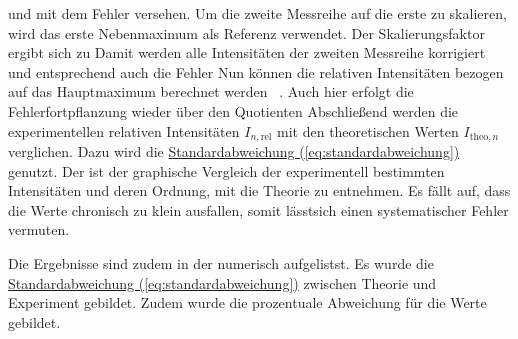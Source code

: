 und mit dem Fehler
versehen. Um die zweite Messreihe auf die erste zu skalieren, wird das erste Nebenmaximum als Referenz verwendet. Der Skalierungsfaktor ergibt sich zu
Damit werden alle Intensitäten der zweiten Messreihe korrigiert
und entsprechend auch die Fehler
Nun können die relativen Intensitäten bezogen auf das Hauptmaximum berechnet werden
 \, .
Auch hier erfolgt die Fehlerfortpflanzung wieder über den Quotienten
Abschließend werden die experimentellen relativen Intensitäten $I_{n,\text{rel}}$ mit den theoretischen Werten $I_{\text{theo},n}$ verglichen. Dazu wird die \hyperref[eq:standardabweichung]{Standardabweichung (\ref*{eq:standardabweichung})} genutzt.
Der  ist der graphische Vergleich der experimentell bestimmten Intensitäten und deren Ordnung, mit die Theorie zu entnehmen. Es fällt auf, dass die Werte chronisch zu klein ausfallen, somit lässtsich einen systematischer Fehler vermuten. 

Die Ergebnisse sind zudem in der  numerisch aufgelistst. Es wurde die \hyperref[eq:standardabweichung]{Standardabweichung (\ref*{eq:standardabweichung})} zwischen Theorie und Experiment gebildet. Zudem wurde die prozentuale Abweichung für die Werte gebildet.


